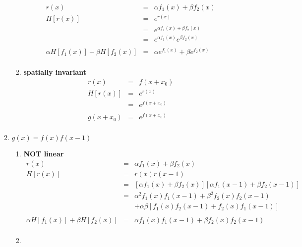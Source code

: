 \documentclass[9pt]{article}
\begin{document}
\begin{enumerate}
\begin{enumerate}
\begin{enumerate}
            \begin{eqnarray*}
              r(x) &=& \alpha f_1(x) + \beta f_2(x) \\
              H[r(x)] &=& e^{r(x)} \\
                      &=& e^{\alpha f_{1}(x) + \beta f_{2}(x)} \\
                      &=& e^{\alpha f_{1}(x)} e^{\beta f_{2}(x)} \\
              \\
              \alpha H[f_1(x)] + \beta H[f_2(x)]
                      &=& \alpha e^{f_1(x)} + \beta e^{f_2(x)} \\
            \end{eqnarray*}
          \item
            \textbf{spatially invariant}
            \begin{eqnarray*}
              r(x) &=& f(x + x_0) \\
              H[r(x)] &=& e^{r(x)} \\
                      &=& e^{f(x + x_0)} \\
              \\
              g(x + x_0) &=& e^{f(x + x_0)} \\
            \end{eqnarray*}
          \end{enumerate}
        \item
          $ g(x) = f(x)f(x-1) $
          \begin{enumerate}
          \item
            \textbf{NOT linear}
            \begin{eqnarray*}
              r(x) &=& \alpha f_1(x) + \beta f_2(x) \\
              H[r(x)] &=& r(x)r(x-1) \\
                      &=& [\alpha f_1(x) + \beta f_2(x)]
                          [\alpha f_1(x-1) + \beta f_2(x-1)] \\
                      &=& \alpha^2 f_1(x) f_1(x-1) + \beta^2 f_2(x) f_2(x-1) \\
                      &&  + \alpha \beta [f_1(x) f_2(x-1) + f_2(x) f_1(x-1)] \\
              \\
              \alpha H[f_1(x)] + \beta H[f_2(x)]
                      &=& \alpha f_1(x) f_1(x-1) + \beta f_2(x) f_2(x-1) \\
            \end{eqnarray*}
          \item

\end{enumerate}
\end{enumerate}
\end{enumerate}
\end{document}
